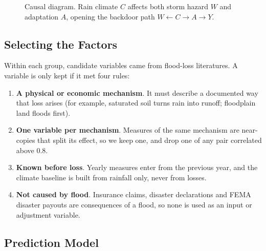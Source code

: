 \documentclass[10pt,twocolumn]{article}
\begin{document}
\begin{figure}[H]
\centering
{}
\caption{Causal diagram. Rain climate $C$ affects both storm hazard $W$ and
adaptation $A$, opening the backdoor path $W \leftarrow C \rightarrow A \rightarrow Y$.}
\label{fig:dag}
\end{figure}

\subsection{Selecting the Factors}
\label{sec:factors}
Within each group, candidate variables came from flood-loss literatures. A variable is only kept if it met four rules:
\begin{enumerate}
\item \textbf{A physical or economic mechanism}. It must describe a documented way that loss arises (for example, saturated soil turns rain into runoff; floodplain land floods first).
\item \textbf{One variable per mechanism}. Measures of the same mechanism are near-copies that split its effect, so we keep one, and drop one of any pair correlated above 0.8.
\item \textbf{Known before loss}. Yearly measures enter from the previous year, and the climate baseline is built from rainfall only, never from losses.
\item \textbf{Not caused by flood}. Insurance claims, disaster declarations and FEMA disaster payouts are consequences of a flood, so none is used as an input or adjustment variable.
\end{enumerate}

\subsection{Prediction Model}
\end{document}
